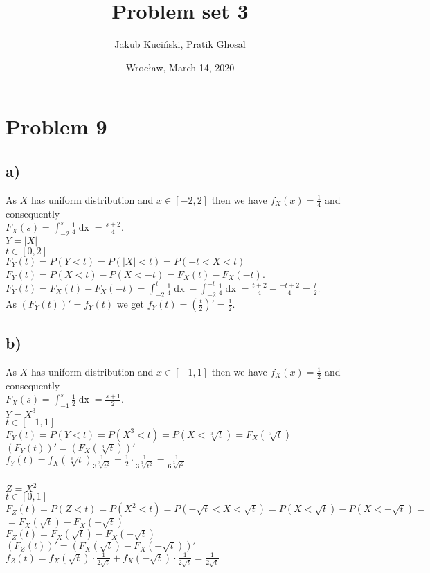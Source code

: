 \documentclass[11pt,wide]{article}
\title{Problem set 3\textdegree}
\date{Wrocław, March 14, 2020}
\author{Jakub Kuciński, Pratik Ghosal}
\begin{document}
\maketitle
\thispagestyle{empty} 
\tableofcontents


\section{Problem 9\textdegree}
\subsection{a)}
As $X$ has uniform distribution and $x \in [-2,2]$ then we have $f_X(x)=\frac{1}{4}$ and consequently \\
\(\displaystyle F_X(s) = \int_{-2}^s \frac{1}{4} \mathop{dx} = \frac{s+2}{4}\).\\
\(Y = |X|\)\\
$t \in [0,2]$\\
\(F_Y(t) = P(Y<t) = P(|X|<t) = P(-t<X<t)\)\\
\(F_Y(t) = P(X<t) - P(X<-t) = F_X(t) - F_X(-t)\).\\
\(\displaystyle F_Y(t) = F_X(t) - F_X(-t) = \int_{-2}^t \frac{1}{4} \mathop{dx} - \int_{-2}^{-t} \frac{1}{4} \mathop{dx} = 
\frac{t+2}{4} - \frac{-t+2}{4} = \frac{t}{2} \).\\
As \(\displaystyle \left( F_Y(t)\right) ' = f_Y(t) \) we get \(\displaystyle f_Y(t) = \left( \frac{t}{2}\right) ' = \frac{1}{2} \).

\subsection{b)}
As $X$ has uniform distribution and $x \in [-1,1]$ then we have 
$f_X(x)=\frac{1}{2}$ 
and consequently \\
\(\displaystyle F_X(s) = \int_{-1}^s \frac{1}{2} \mathop{dx} = \frac{s+1}{2}\).\\
\(Y = X^3\)\\
\( t\in [-1,1]\)\\
\(F_Y(t) = P(Y<t) = P(X^3<t) = P(X<\sqrt[3]{t}) = F_X(\sqrt[3]{t}) \) \\
\(\displaystyle (F_Y(t))' = (F_X(\sqrt[3]{t}))' \) \\
\(\displaystyle f_Y(t) = f_X(\sqrt[3]{t}) \frac{1}{3\sqrt[3]{t^2}} = \frac{1}{2} \cdot \frac{1}{3\sqrt[3]{t^2}} = 
\frac{1}{6\sqrt[3]{t^2}} \) \\ \\
\(Z = X^2\)\\
\( t\in [0,1]\)\\
\(\displaystyle F_Z(t) = P(Z<t) = P(X^2<t) = P(-\sqrt{t}<X<\sqrt{t}) = P(X<\sqrt{t}) - P(X<-\sqrt{t}) = \) \\
\(\displaystyle = F_X(\sqrt{t}) - F_X(-\sqrt{t}) \) \\
\(\displaystyle F_Z(t) = F_X(\sqrt{t}) - F_X(-\sqrt{t}) \) \\
\(\displaystyle (F_Z(t))' = (F_X(\sqrt{t}) - F_X(-\sqrt{t}))' \) \\
\(\displaystyle f_Z(t) = f_X(\sqrt{t}) \cdot \frac{1}{2\sqrt{t}} + f_X(-\sqrt{t}) \cdot \frac{1}{2\sqrt{t}} = \frac{1}{2\sqrt{t}} \)
\end{document}

